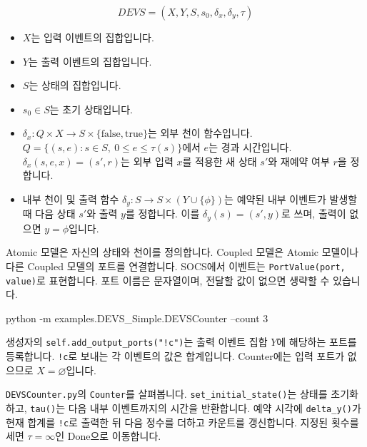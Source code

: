 \documentclass[11pt,a4paper]{article}
\newcommand{\api}[1]{\texttt{#1}}
\newcommand{\chaptermark}[1]{\par\noindent{\LARGE\color{ink}\bfseries #1}\par\smallskip}
\newcommand{\topic}[1]{\par\medskip{\large\color{accent}\bfseries #1}\par}
\begin{document}
\begin{equation}
DEVS=(X, Y, S, s_0, \delta_x, \delta_y, \tau)
\label{eq:devs}
\end{equation}
\begin{itemize}
  \item $X$는 입력 이벤트의 집합입니다.
  \item $Y$는 출력 이벤트의 집합입니다.
  \item $S$는 상태의 집합입니다.
  \item $s_0 \in S$는 초기 상태입니다.
  \item $\delta_x\colon Q\times X\to S\times\{\mathrm{false},\mathrm{true}\}$는 외부 천이 함수입니다. $Q=\{(s,e):s\in S,\ 0\le e\le\tau(s)\}$에서 $e$는 경과 시간입니다. $\delta_x(s,e,x)=(s',r)$는 외부 입력 $x$를 적용한 새 상태 $s'$와 재예약 여부 $r$을 정합니다.
  \item 내부 천이 및 출력 함수 $\delta_y\colon S\to S\times (Y\cup\{\phi\})$는 예약된 내부 이벤트가 발생할 때 다음 상태 $s'$와 출력 $y$를 정합니다. 이를 $\delta_y(s)=(s',y)$로 쓰며, 출력이 없으면 $y=\phi$입니다.
\end{itemize}

\newpage
\chaptermark{2.1 \enspace DEVS}

Atomic 모델은 자신의 상태와 천이를 정의합니다. Coupled 모델은 Atomic 모델이나
다른 Coupled 모델의 포트를 연결합니다. SOCS에서 이벤트는 \api{PortValue(port, value)}로
표현합니다. 포트 이름은 문자열이며, 전달할 값이 없으면 생략할 수 있습니다.

\topic{2.1.1 \enspace DEVSCounter}
\begin{Code}
python -m examples.DEVS_Simple.DEVSCounter --count 3
\end{Code}
생성자의 \api{self.add\_output\_ports("!c")}는 출력 이벤트 집합 \(Y\)에 해당하는
포트를 등록합니다. \api{!c}로 보내는 각 이벤트의 값은 합계입니다.
Counter에는 입력 포트가 없으므로 \(X=\varnothing\)입니다.

\api{DEVSCounter.py}의 \api{Counter}를 살펴봅니다. \api{set\_initial\_state()}는 상태를
초기화하고, \api{tau()}는 다음 내부 이벤트까지의 시간을 반환합니다. 예약 시각에
\api{delta\_y()}가 현재 합계를 \api{!c}로 출력한 뒤 다음 정수를 더하고 카운트를
갱신합니다. 지정된 횟수를 세면 \(\tau=\infty\)인 Done으로 이동합니다.
\end{document}
